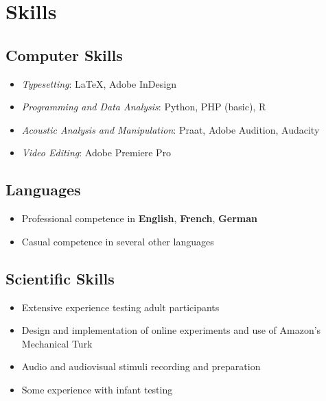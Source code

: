 \documentclass[a4paper, 10pt]{article}
\begin{document}
\section*{Skills}


\subsection*{Computer Skills}

\begin{itemize}
\item \textit{Typesetting}: {\LaTeX{}, Adobe InDesign}
\item \textit{Programming and Data Analysis}: {Python, PHP (basic), R}
\item \textit{Acoustic Analysis and Manipulation}: {Praat, Adobe Audition, Audacity}
\item \textit{Video Editing}: {Adobe Premiere Pro}
\end{itemize}


\subsection*{Languages}

\begin{itemize}
\item Professional competence in \textbf{English}, \textbf{French},
  \textbf{German}
\item Casual competence in several other languages
\end{itemize}

\fi



\iffalse


\subsection*{Scientific Skills}

\begin{itemize}
\item Extensive experience testing adult participants
\item Design and implementation of online experiments and use of
  Amazon's Mechanical Turk
\item Audio and audiovisual stimuli recording and preparation
\item Some experience with infant testing

\end{itemize}
\end{document}
